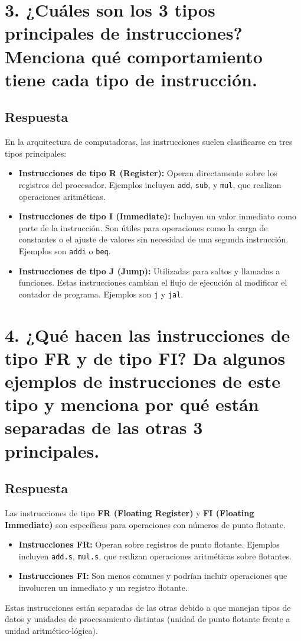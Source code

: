 \documentclass{article}
\begin{document}
\section*{3. ¿Cuáles son los 3 tipos principales de instrucciones? Menciona qué comportamiento tiene cada tipo de instrucción.}
\subsection*{Respuesta}
En la arquitectura de computadoras, las instrucciones suelen clasificarse en tres tipos principales:
\begin{itemize}
    \item \textbf{Instrucciones de tipo R (Register):} Operan directamente sobre los registros del procesador. Ejemplos incluyen \texttt{add}, \texttt{sub}, y \texttt{mul}, que realizan operaciones aritméticas.
    \item \textbf{Instrucciones de tipo I (Immediate):} Incluyen un valor inmediato como parte de la instrucción. Son útiles para operaciones como la carga de constantes o el ajuste de valores sin necesidad de una segunda instrucción. Ejemplos son \texttt{addi} o \texttt{beq}.
    \item \textbf{Instrucciones de tipo J (Jump):} Utilizadas para saltos y llamadas a funciones. Estas instrucciones cambian el flujo de ejecución al modificar el contador de programa. Ejemplos son \texttt{j} y \texttt{jal}.
\end{itemize}

\section*{4. ¿Qué hacen las instrucciones de tipo FR y de tipo FI? Da algunos ejemplos de instrucciones de este tipo y menciona por qué están separadas de las otras 3 principales.}
\subsection*{Respuesta}
Las instrucciones de tipo \textbf{FR (Floating Register)} y \textbf{FI (Floating Immediate)} son específicas para operaciones con números de punto flotante. 
\begin{itemize}
    \item \textbf{Instrucciones FR:} Operan sobre registros de punto flotante. Ejemplos incluyen \texttt{add.s}, \texttt{mul.s}, que realizan operaciones aritméticas sobre flotantes.
    \item \textbf{Instrucciones FI:} Son menos comunes y podrían incluir operaciones que involucren un inmediato y un registro flotante.
\end{itemize}
Estas instrucciones están separadas de las otras debido a que manejan tipos de datos y unidades de procesamiento distintas (unidad de punto flotante frente a unidad aritmético-lógica).
\end{document}
